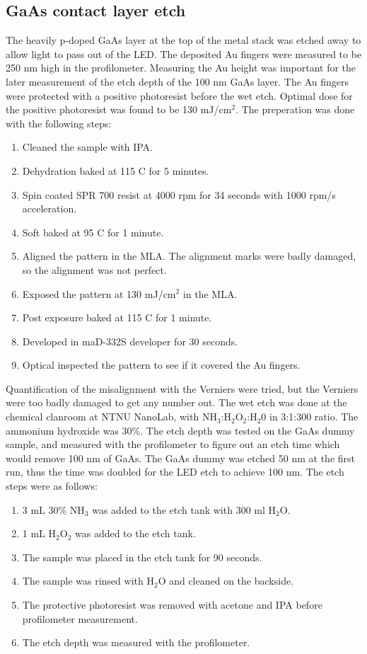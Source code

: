 \subsection{GaAs contact layer etch}
\label{methods:wet_etch}
The heavily p-doped GaAs layer at the top of the metal stack was etched away to allow light to pass out of the LED.
The deposited Au fingers were measured to be 250 nm high in the profilometer.
Measuring the Au height was important for the later measurement of the etch depth of the 100 nm GaAs layer.
The Au fingers were protected with a positive photoresist before the wet etch.
Optimal dose for the positive photoresist was found to be 130 mJ/cm$^2$.
The preperation was done with the following steps:
\begin{enumerate}
    \item Cleaned the sample with IPA.
    \item Dehydration baked at 115 \textdegree C for 5 minutes.
    \item Spin coated SPR 700 resist at 4000 rpm for 34 seconds with 1000 rpm/s acceleration.
    \item Soft baked at 95 \textdegree C for 1 minute.
    \item Aligned the pattern in the MLA. The alignment marks were badly damaged, so the alignment was not perfect. %
    \item Exposed the pattern at 130 mJ/cm$^2$ in the MLA.
    \item Post exposure baked at 115 \textdegree C for 1 minute.
    \item Developed in maD-332S developer for 30 seconds.
    \item Optical inspected the pattern to see if it covered the Au fingers.
\end{enumerate}

Quantification of the misalignment with the Verniers were tried, but the Verniers were too badly damaged to get any number out.
The wet etch was done at the chemical clanroom at NTNU NanoLab, with NH$_3$:H$_2$O$_2$:H$_2$0 in 3:1:300 ratio.
The ammonium hydroxide was 30\%.
The etch depth was tested on the GaAs dummy sample, and measured with the profilometer to figure out an etch time which would remove 100 nm of GaAs.
The GaAs dummy was etched 50 nm at the first run, thus the time was doubled for the LED etch to achieve 100 nm.
The etch steps were as follows:

\begin{enumerate}
    \item 3 mL 30\% NH$_3$ was added to the etch tank with 300 ml H$_2$O.
    \item 1 mL H$_2$O$_2$ was added to the etch tank.
    \item The sample was placed in the etch tank for 90 seconds.
    \item The sample was rinsed with H$_2$O and cleaned on the backside.
    \item The protective photoresist was removed with acetone and IPA before profilometer measurement.
    \item The etch depth was measured with the profilometer.
\end{enumerate}



